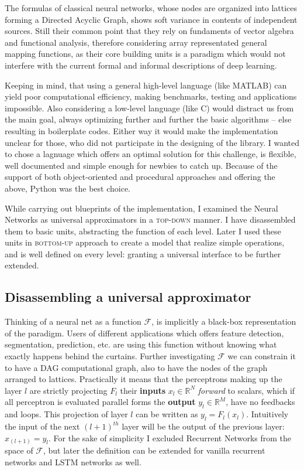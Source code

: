 The formulas of classical neural networks, whose nodes are organized into lattices forming a Directed Acyclic Graph, shows soft variance in contents of independent sources. Still their common point that they rely on fundaments of vector algebra and functional analysis, therefore considering array representated general mapping functions, as their core building units is a paradigm which would not interfere with the current formal and informal descriptions of deep learning.

Keeping in mind, that using a general high-level language (like MATLAB) can yield poor computational efficiency, making benchmarks, testing and applications impossible.
Also considering a low-level language (like C) would distract us from the main goal, always optimizing further and further the basic algorithms -- else resulting in boilerplate codes. Either way it would make the implementation unclear for those, who did not participate in the designing of the library.
I wanted to chose a lagnuage which offers an optimal solution for this challenge, is flexible, well documented and simple enough for newbies to catch up.
Because of the support of both object-oriented and procedural approaches and offering the above, Python was the best choice.

While carrying out blueprints of the implementation, I examined the Neural Networks as universal approximators in a \textsc{top-down} manner.
I have disassembled them to basic units, abstracting the function of each level.
Later I used these units in \textsc{bottom-up} approach to create a model that realize simple operations, and is well defined on every level: granting a universal interface to be further extended.

\subsection{Disassembling a universal approximator}
Thinking of a neural net as a function \(\mathcal{F}\), is implicitly a black-box representation of the paradigm.
Users of different applications which offers feature detection, segmentation, prediction, etc. are using this function without knowing what exactly happens behind the curtains. 
Further investigating \(\mathcal{F}\) we can constrain it to have a DAG computational graph, also to have the nodes of the graph arranged to lattices.
Practically it means that the perceptrons making up the layer \(l\) are strictly projecting $F_l$ their \textbf{inputs} 
$ x_l \in \mathbb{R}^N $ \emph{forward} to scalars, which if all perceptron is evaluated parallel forms the 
\textbf{output} $y_l \in \mathbb{R}^M$, have no feedbacks and loops. 
This projection of layer $l$ can be written as $y_l = F_l(x_l)$. 
Intuitively the input of the next $(l+1)^{th}$ layer will be the output of the previous layer:
$x_{(l+1)} = y_l$.
For the sake of simplicity I excluded Recurrent Networks from the space of $\mathcal{F}$, but later the definition can be extended for vanilla recurrent networks and LSTM networks as well.

